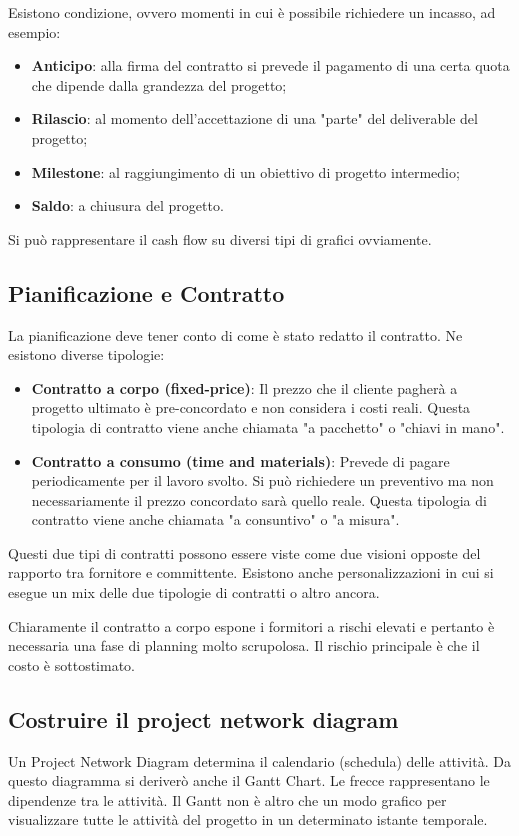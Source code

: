 Esistono condizione, ovvero momenti in cui è possibile richiedere un incasso, ad esempio:
\begin{itemize}
	\item \textbf{Anticipo}: alla firma del contratto si prevede il pagamento di una certa quota che dipende dalla grandezza del progetto;
	\item \textbf{Rilascio}: al momento dell'accettazione di una "parte" del deliverable del progetto;
	\item \textbf{Milestone}: al raggiungimento di un obiettivo di progetto intermedio;
	\item \textbf{Saldo}: a chiusura del progetto.
\end{itemize}
Si può rappresentare il cash flow su diversi tipi di grafici ovviamente.
\subsection{Pianificazione e Contratto}
La pianificazione deve tener conto di come è stato redatto il contratto. Ne esistono diverse tipologie:
\begin{itemize}
	\item \textbf{Contratto a corpo (fixed-price)}: Il prezzo che il cliente pagherà a progetto ultimato è pre-concordato e non considera i costi reali. Questa tipologia di contratto viene anche chiamata "a pacchetto" o "chiavi in mano".
	\item \textbf{Contratto a consumo (time and materials)}: Prevede di pagare periodicamente per il lavoro svolto. Si può richiedere un preventivo ma non necessariamente il prezzo concordato sarà quello reale. Questa tipologia di contratto viene anche chiamata "a consuntivo" o "a misura".
\end{itemize}
Questi due tipi di contratti possono essere viste come due visioni opposte del rapporto tra fornitore e committente. Esistono anche personalizzazioni in cui si esegue un mix delle due tipologie di contratti o altro ancora.

\noindent Chiaramente il contratto a corpo espone i formitori a rischi elevati e pertanto è necessaria una fase di planning molto scrupolosa. Il rischio principale è che il costo è sottostimato.
\subsection{Costruire il project network diagram}
Un Project Network Diagram determina il calendario (schedula) delle attività. Da questo diagramma si deriverò anche il Gantt Chart. Le frecce rappresentano le dipendenze tra le attività. Il Gantt non è altro che un modo grafico per visualizzare tutte le attività del progetto in un determinato istante temporale.
